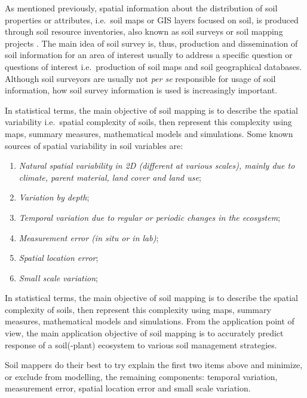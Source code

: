 \documentclass[graybox,natbib,nospthms,UStrade]{svmono}
\let\BeginKnitrBlock\begin \let\EndKnitrBlock\end
\let\BeginKnitrBlock\begin \let\EndKnitrBlock\end
\begin{document}
As mentioned previously, spatial information about the distribution of
soil properties or attributes, i.e.~soil maps or GIS layers focused on
soil, is produced through soil resource inventories, also known as soil
surveys or soil mapping projects
\citep{Burrough1971, Avery1987, Wysocki2005Geoderma, Legros2006SP}. The
main idea of soil survey is, thus, production and dissemination of soil
information for an area of interest usually to address a specific
question or questions of interest i.e.~production of soil maps and soil
geographical databases. Although soil surveyors are usually not \emph{per se}
responsible for usage of soil information, how soil survey information
is used is increasingly important.

In statistical terms, the main objective of soil mapping is to describe
the spatial variability i.e.~spatial complexity of soils, then represent
this complexity using maps, summary measures, mathematical models and
simulations. Some known sources of spatial variability in soil variables
are:

\begin{enumerate}
\def\labelenumi{\arabic{enumi}.}
\item
  \emph{Natural spatial variability in 2D (different at various scales),
  mainly due to climate, parent material, land cover and land use};
\item
  \emph{Variation by depth};
\item
  \emph{Temporal variation due to regular or periodic changes in the
  ecosystem};
\item
  \emph{Measurement error (in situ or in lab)};
\item
  \emph{Spatial location error};
\item
  \emph{Small scale variation};
\end{enumerate}

\BeginKnitrBlock{rmdnote}
In statistical terms, the main objective of
soil mapping is to describe the spatial complexity of soils, then
represent this complexity using maps, summary measures, mathematical
models and simulations. From the application point of view, the main
application objective of soil mapping is to accurately predict response of a
soil(-plant) ecosystem to various soil management strategies.
\EndKnitrBlock{rmdnote}

Soil mappers do their best to try explain the first two items above and
minimize, or exclude from modelling, the remaining components: temporal
variation, measurement error, spatial location error and small scale
variation.
\end{document}

